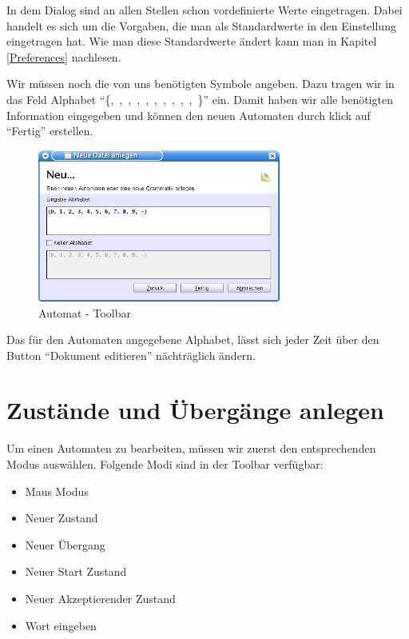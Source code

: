In dem Dialog sind an allen Stellen schon vordefinierte Werte eingetragen. Dabei
handelt es sich um die Vorgaben, die man als Standardwerte in den Einstellung
eingetragen hat. Wie man diese Standardwerte ändert kann man in Kapitel
\ref{Preferences} nachlesen.\vspace{10pt}

Wir müssen noch die von uns benötigten Symbole angeben. Dazu tragen wir in das
Feld Alphabet "`\{,\ ,\ ,\ ,\
,\ ,\ ,\ ,\ ,\ ,\
\Symbol{-}\}"' ein. Damit haben wir alle benötigten Information eingegeben und
können den neuen Automaten durch klick auf "`Fertig"' erstellen.\vspace{10pt}
\vspace{10pt} 

\begin{figure}[h]
\begin{center}
\includegraphics[width=8cm]{images/new_dialog_machine.png}
\caption{Automat - Toolbar}
\end{center}
\end{figure}

Das für den Automaten angegebene Alphabet, lässt sich jeder Zeit über den Button
"`Dokument editieren"' nächträglich ändern.

\section{Zustände und Übergänge anlegen}

Um einen Automaten zu bearbeiten, müssen wir zuerst den entsprechenden Modus
auswählen. Folgende Modi sind in der Toolbar verfügbar:

\begin{itemize}
  \item Maus Modus
  \item Neuer Zustand
  \item Neuer Übergang
  \item Neuer Start Zustand
  \item Neuer Akzeptierender Zustand
  \item Wort eingeben
\end{itemize}

